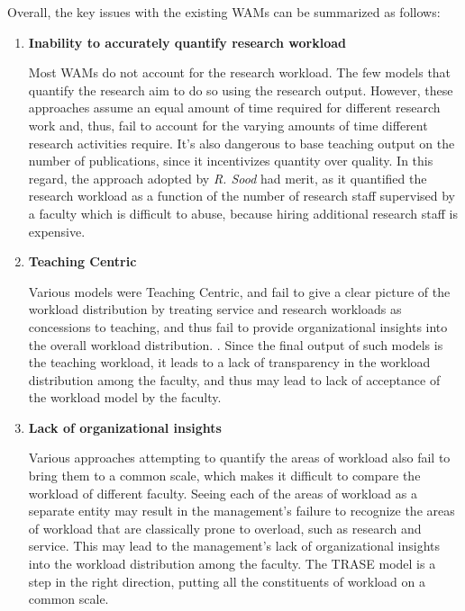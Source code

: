 Overall, the key issues with the existing WAMs can be summarized as follows:

\begin{enumerate}

  \item \textbf{Inability to accurately quantify research workload}

        Most WAMs do not account for the research workload. The few models that quantify the research aim to do so using the research output. However, these approaches assume an equal amount of time required for different research work and, thus, fail to account for the varying amounts of time different research activities require. It's also dangerous to base teaching output on the number of publications, since it incentivizes quantity over quality. In this regard, the approach adopted by \textit{R. Sood} \cite{rohan2017} had merit, as it quantified the research workload as a function of the number of research staff supervised by a faculty which is difficult to abuse, because hiring additional research staff is expensive.

  \item \textbf{Teaching Centric}

        Various models were Teaching Centric, and fail to give a clear picture of the workload distribution by treating service and research workloads as concessions to teaching, and thus fail to provide organizational insights into the overall workload distribution. \cite{rohan2017}. Since the final output of such models is the teaching workload, it leads to a lack of transparency in the workload distribution among the faculty, and thus may lead to lack of acceptance of the workload model by the faculty.

  \item \textbf{Lack of organizational insights}

        Various approaches attempting to quantify the areas of workload also fail to bring them to a common scale, which makes it difficult to compare the workload of different faculty. Seeing each of the areas of workload as a separate entity may result in the management's failure to recognize the areas of workload that are classically prone to overload, such as research and service. This may lead to the management's lack of organizational insights into the workload distribution among the faculty. The TRASE model \cite{narasimhan32trase} is a step in the right direction, putting all the constituents of workload on a common scale.


\end{enumerate}
